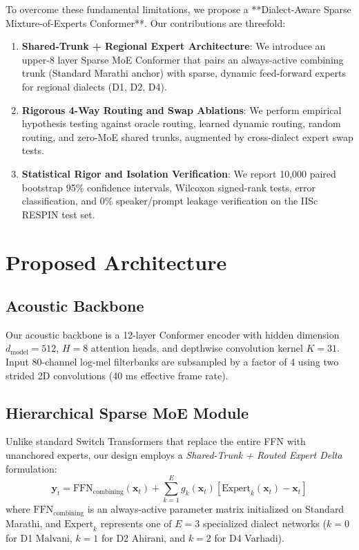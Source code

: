 \documentclass{article}
\begin{document}
To overcome these fundamental limitations, we propose a **Dialect-Aware Sparse Mixture-of-Experts Conformer**. Our contributions are threefold:
\begin{enumerate}
    \item \textbf{Shared-Trunk + Regional Expert Architecture}: We introduce an upper-8 layer Sparse MoE Conformer that pairs an always-active combining trunk (Standard Marathi anchor) with sparse, dynamic feed-forward experts for regional dialects (D1, D2, D4).
    \item \textbf{Rigorous 4-Way Routing and Swap Ablations}: We perform empirical hypothesis testing against oracle routing, learned dynamic routing, random routing, and zero-MoE shared trunks, augmented by cross-dialect expert swap tests.
    \item \textbf{Statistical Rigor and Isolation Verification}: We report 10,000 paired bootstrap 95\% confidence intervals, Wilcoxon signed-rank tests, error classification, and 0\% speaker/prompt leakage verification on the IISc RESPIN test set.
\end{enumerate}

\section{Proposed Architecture}

\subsection{Acoustic Backbone}
Our acoustic backbone is a 12-layer Conformer encoder \cite{gulati2020conformer} with hidden dimension $d_{\text{model}} = 512$, $H=8$ attention heads, and depthwise convolution kernel $K=31$. Input 80-channel log-mel filterbanks are subsampled by a factor of 4 using two strided 2D convolutions (40 ms effective frame rate).

\subsection{Hierarchical Sparse MoE Module}
Unlike standard Switch Transformers \cite{fedus2022switch} that replace the entire FFN with unanchored experts, our design employs a \textit{Shared-Trunk + Routed Expert Delta} formulation:
\begin{equation}
    \mathbf{y}_t = \text{FFN}_{\text{combining}}(\mathbf{x}_t) + \sum_{k=1}^{E} g_k(\mathbf{x}_t) \left[ \text{Expert}_k(\mathbf{x}_t) - \mathbf{x}_t \right]
\end{equation}
where $\text{FFN}_{\text{combining}}$ is an always-active parameter matrix initialized on Standard Marathi, and $\text{Expert}_k$ represents one of $E=3$ specialized dialect networks ($k=0$ for D1 Malvani, $k=1$ for D2 Ahirani, and $k=2$ for D4 Varhadi).
\end{document}
